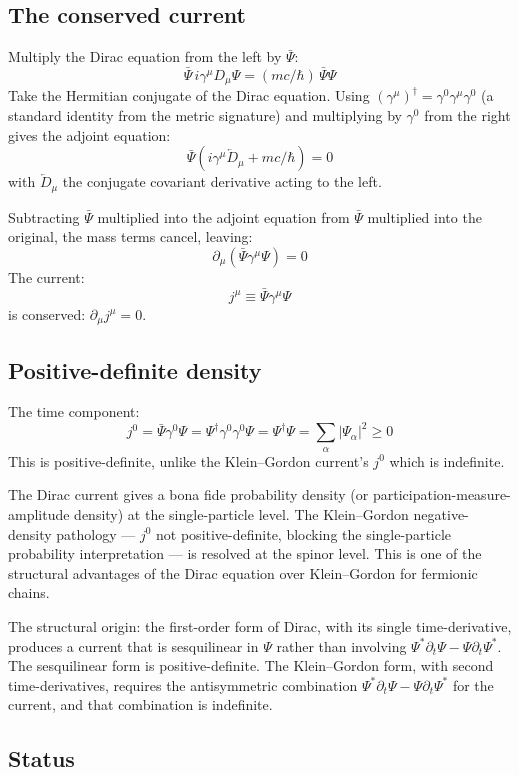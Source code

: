 \documentclass[11pt,a4paper]{article}
\begin{document}
\subsection{The conserved current}

Multiply the Dirac equation from the left by $\bar\Psi$:
\[
\bar\Psi\, i\gamma^\mu D_\mu\Psi = (mc/\hbar)\, \bar\Psi\Psi
\]
Take the Hermitian conjugate of the Dirac equation. Using $(\gamma^\mu)^\dagger = \gamma^0\gamma^\mu\gamma^0$ (a standard identity from the metric signature) and multiplying by $\gamma^0$ from the right gives the adjoint equation:
\[
\bar\Psi(i\gamma^\mu\overleftarrow{D}_\mu + mc/\hbar) = 0
\]
with $\overleftarrow{D}_\mu$ the conjugate covariant derivative acting to the left.

Subtracting $\bar\Psi$ multiplied into the adjoint equation from $\bar\Psi$ multiplied into the original, the mass terms cancel, leaving:
\[
\partial_\mu(\bar\Psi\gamma^\mu\Psi) = 0
\]
The current:
\[
j^\mu \equiv \bar\Psi\gamma^\mu\Psi
\]
is conserved: $\partial_\mu j^\mu = 0$.

\subsection{Positive-definite density}

The time component:
\[
j^0 = \bar\Psi\gamma^0\Psi = \Psi^\dagger\gamma^0\gamma^0\Psi = \Psi^\dagger\Psi = \sum_\alpha |\Psi_\alpha|^{2} \geq 0
\]
This is positive-definite, unlike the Klein--Gordon current's $j^0$ which is indefinite.

The Dirac current gives a bona fide probability density (or participation-measure-amplitude density) at the single-particle level. The Klein--Gordon negative-density pathology --- $j^0$ not positive-definite, blocking the single-particle probability interpretation --- is resolved at the spinor level. This is one of the structural advantages of the Dirac equation over Klein--Gordon for fermionic chains.

The structural origin: the first-order form of Dirac, with its single time-derivative, produces a current that is sesquilinear in $\Psi$ rather than involving $\Psi^*\partial_t\Psi - \Psi\partial_t\Psi^*$. The sesquilinear form is positive-definite. The Klein--Gordon form, with second time-derivatives, requires the antisymmetric combination $\Psi^*\partial_t\Psi - \Psi\partial_t\Psi^*$ for the current, and that combination is indefinite.

\subsection{Status}
\end{document}

